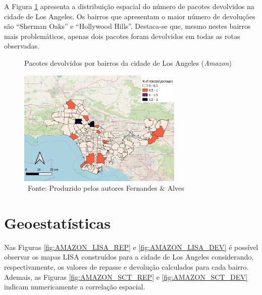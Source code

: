 A Figura \ref{fig:devolucoes_LA} apresenta a distribuição espacial do número de pacotes devolvidos na cidade de Los Angeles.
Os bairros que apresentam o maior número de devoluções são ``Sherman Oaks'' e ``Hollywood Hills''.
Destaca-se que, mesmo nestes bairros mais problemáticos, apenas dois pacotes foram devolvidos em todas as rotas observadas.

\begin{figure}[H]
    \centering
    \caption{Pacotes devolvidos por bairros da cidade de Los Angeles (\textit{Amazon})}
    \label{fig:devolucoes_LA}
    \includegraphics[width=0.7\textwidth]{images/6_amazon/rep_e_dev/los_angeles_rejected.png}
    \caption*{\ Fonte: Produzido pelos autores Fernandes \& Alves}
\end{figure}


\section{Geoestatísticas} \label{sec:Amazon_AnalisesPreliminares}

Nas Figuras \ref{fig:AMAZON_LISA_REP} e \ref{fig:AMAZON_LISA_DEV} é possível observar os mapas LISA construídos para a cidade de Los Angeles considerando, respectivamente, os valores de repasse e devolução calculados para cada bairro. 
Ademais, as Figuras \ref{fig:AMAZON_SCT_REP} e \ref{fig:AMAZON_SCT_DEV} indicam numericamente a correlação espacial. 

